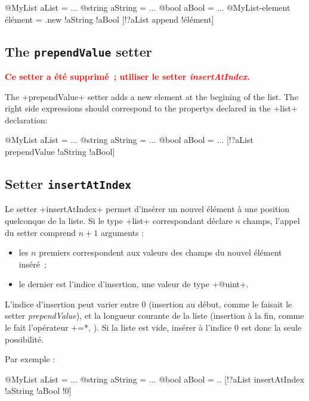 \begin{galgas}
@MyList aList = ... 
@string aString = ... 
@bool aBool = ... 
@MyList-element élément = .new {!aString !aBool}
[!?aList append !élément]
\end{galgas}


\subsection{The \texttt{prependValue} setter}

{\bf \textcolor{red}{Ce setter a été supprimé~; utiliser le setter \emph{insertAtIndex}.}}

The \ggs+prependValue+ setter adds a new element at the begining of the list. The right side expressions should correspond to the propertys declared in the  \ggs+list+ declaration:

\begin{galgas}
@MyList aList = ...
@string aString = ...
@bool aBool = ...
[!?aList prependValue !aString !aBool]
\end{galgas}




\subsection{Setter \texttt{insertAtIndex}}

Le setter \ggs+insertAtIndex+ permet d'insérer un nouvel élément à une position quelconque de la liste. Si le type \ggs+list+ correspondant déclare $n$ champs, l'appel du setter comprend $n+1$ arguments :
\begin{itemize}
  \item les $n$ premiers correspondent aux valeurs des champs du nouvel élément inséré~;
  \item le dernier est l'indice d'insertion, une valeur de type \ggs+@uint+.
\end{itemize}

L'indice d'insertion peut varier entre $0$ (insertion au début, comme le faisait le setter \emph{prependValue}), et la longueur courante de la liste (insertion à la fin, comme le fait l'opérateur \ggs*+=*, ). Si la liste est vide, insérer à l'indice $0$ est donc la seule possibilité.

Par exemple :

\begin{galgas}
@MyList aList = ...
@string aString = ...
@bool aBool = ..
[!?aList insertAtIndex !aString !aBool !0]
\end{galgas}

